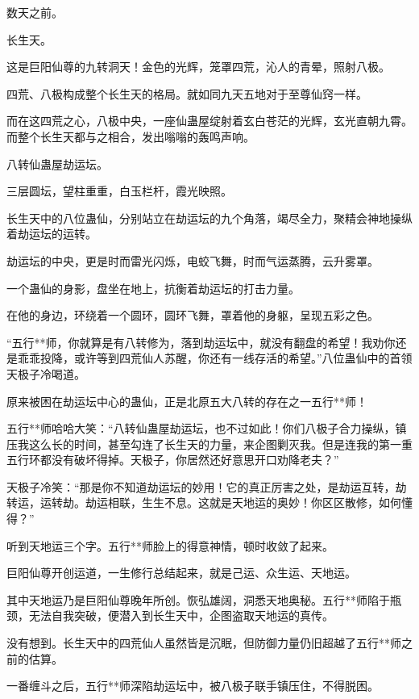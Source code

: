 
\begin{this_body}

数天之前。

长生天。

这是巨阳仙尊的九转洞天！金色的光辉，笼罩四荒，沁人的青晕，照射八极。

四荒、八极构成整个长生天的格局。就如同九天五地对于至尊仙窍一样。

而在这四荒之心，八极中央，一座仙蛊屋绽射着玄白苍茫的光辉，玄光直朝九霄。而整个长生天都与之相合，发出嗡嗡的轰鸣声响。

八转仙蛊屋劫运坛。

三层圆坛，望柱重重，白玉栏杆，霞光映照。

长生天中的八位蛊仙，分别站立在劫运坛的九个角落，竭尽全力，聚精会神地操纵着劫运坛的运转。

劫运坛的中央，更是时而雷光闪烁，电蛟飞舞，时而气运蒸腾，云升雾罩。

一个蛊仙的身影，盘坐在地上，抗衡着劫运坛的打击力量。

在他的身边，环绕着一个圆环，圆环飞舞，罩着他的身躯，呈现五彩之色。

“五行**师，你就算是有八转修为，落到劫运坛中，就没有翻盘的希望！我劝你还是乖乖投降，或许等到四荒仙人苏醒，你还有一线存活的希望。”八位蛊仙中的首领天极子冷喝道。

原来被困在劫运坛中心的蛊仙，正是北原五大八转的存在之一五行**师！

五行**师哈哈大笑：“八转仙蛊屋劫运坛，也不过如此！你们八极子合力操纵，镇压我这么长的时间，甚至勾连了长生天的力量，来企图剿灭我。但是连我的第一重五行环都没有破坏得掉。天极子，你居然还好意思开口劝降老夫？”

天极子冷笑：“那是你不知道劫运坛的妙用！它的真正厉害之处，是劫运互转，劫转运，运转劫。劫运相联，生生不息。这就是天地运的奥妙！你区区散修，如何懂得？”

听到天地运三个字。五行**师脸上的得意神情，顿时收敛了起来。

巨阳仙尊开创运道，一生修行总结起来，就是己运、众生运、天地运。

其中天地运乃是巨阳仙尊晚年所创。恢弘雄阔，洞悉天地奥秘。五行**师陷于瓶颈，无法自我突破，便潜入到长生天中，企图盗取天地运的真传。

没有想到。长生天中的四荒仙人虽然皆是沉眠，但防御力量仍旧超越了五行**师之前的估算。

一番缠斗之后，五行**师深陷劫运坛中，被八极子联手镇压住，不得脱困。


\end{this_body}
